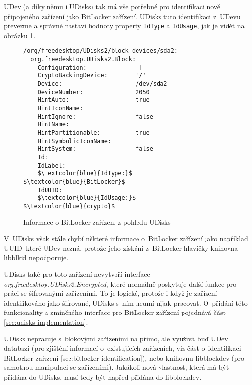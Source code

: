 UDev (a díky němu i UDisks) tak má vše potřebné pro identifikaci nově připojeného zařízení jako BitLocker zařízení. UDisks tuto identifikaci z~UDevu převezme a správně nastaví hodnoty property \texttt{IdType} a \texttt{IdUsage}, jak je vidět na obrázku \ref{fig:udisks-bitlocker-without-support}.

\begin{figure}[h]
		\centering
		\captionsetup{width=0.65\linewidth}
\begin{center}
\centering
\begin{lstlisting}[frame=none, escapechar=$, basicstyle=\ttfamily\small, columns=fullflexible, keepspaces=true, xleftmargin=.2\textwidth, xrightmargin=.2\textwidth]
/org/freedesktop/UDisks2/block_devices/sda2:
  org.freedesktop.UDisks2.Block:
    Configuration:              []
    CryptoBackingDevice:        '/'
    Device:                     /dev/sda2
    DeviceNumber:               2050
    HintAuto:                   true
    HintIconName:
    HintIgnore:                 false
    HintName:
    HintPartitionable:          true
    HintSymbolicIconName:
    HintSystem:                 false
    Id:
    IdLabel:
    $\textcolor{blue}{IdType:}$                     $\textcolor{blue}{BitLocker}$
    IdUUID:
    $\textcolor{blue}{IdUsage:}$                    $\textcolor{blue}{crypto}$
\end{lstlisting}
\end{center}
		\caption{Informace o BitLocker zařízení z pohledu UDisks}
		\label{fig:udisks-bitlocker-without-support}
\end{figure}

V~UDisks však stále chybí některé informace o~BitLocker zařízení jako například UUID, které UDev nezná, protože jeho získání z~BitLocker hlavičky knihovna libblkid nepodporuje.

UDisks také pro toto zařízení nevytvoří interface \emph{org.freedesktop.UDisks2.Encrypted}, které normálně poskytuje další funkce pro práci se šifrovanými zařízeními. To je logické, protože i když je zařízení identifikováno jako šifrované, UDisks s~ním neumí nijak pracovat. O~přidání této funkcionality a zmíněného interface pro BitLocker zařízení pojednává část \ref{sec:udisks-implementation}.

\label{sec:libblockdev}

UDisks nepracuje s~blokovými zařízeními na přímo, ale využívá buď UDev databázi (pro zjištění informací o~existujících zařízeních, viz část o~identifikaci BitLocker zařízení \ref{sec:bitlocker-identification}), nebo knihovnu libblockdev (pro samotnou manipulaci se zařízeními)\cite{Podzimek2017}. Jakákoli nová vlastnost, která má být přidána do UDisks, musí tedy být napřed přidána do libblockdev.

